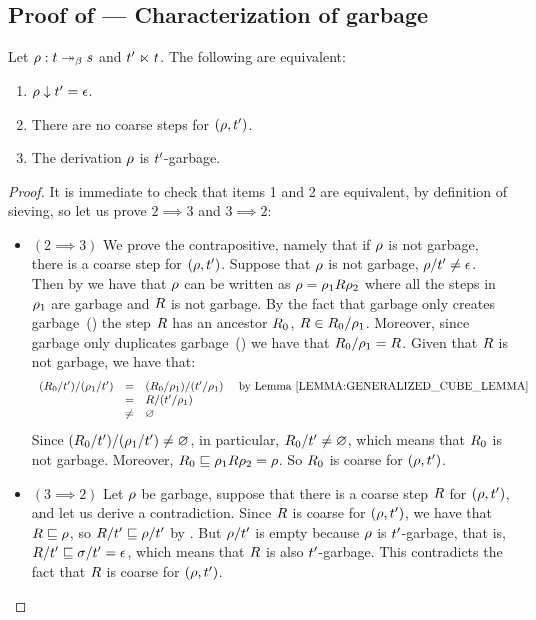 \subsection*{Proof of  --- Characterization of garbage}
\label{characterization_of_garbage_proof}
Let $\rho : t \mathrel{\twoheadrightarrow_\beta} s$ and $t' \mathrel{\ltimes} t$.
The following are equivalent:
\begin{enumerate}
\item $\rho \downarrow t' = \epsilon$.
\item There are no coarse steps for $(\rho,t')$.
\item The derivation $\rho$ is $t'$-garbage.
\end{enumerate}
\begin{proof}
It is immediate to check that items 1 and 2 are equivalent, by definition of sieving,
so let us prove $2 \implies 3$ and $3 \implies 2$:
\begin{itemize}
\item $(2 \implies 3)$
  We prove the contrapositive, namely that if $\rho$ is not garbage,
  there is a coarse step for $(\rho,t')$.
  Suppose that $\rho$ is not garbage, \ie $\rho/t' \neq \epsilon$.
  Then by 
  we have that $\rho$ can be written as $\rho = \rho_1 R \rho_2$ where
  all the steps in $\rho_1$ are garbage and $R$ is not garbage.
  By the fact that garbage only creates garbage~()
  the step $R$ has an ancestor $R_0$, \ie $R \in R_0/\rho_1$.
  Moreover, since garbage only duplicates garbage~()
  we have that $R_0/\rho_1 = R$.
  Given that $R$ is not garbage, we have that:
  \[
    \begin{array}{rcll}
          (\redex_0/\tm')/(\redseq_1/\tm')
    & = & (\redex_0/\redseq_1)/(\tm'/\redseq_1) & \text{ by \rlem{generalized_cube_lemma}} \\
    & = & \redex/(\tm'/\redseq_1) \\
    & \neq & \emptyset \\
    \end{array}
  \]
  Since $(R_0/t')/(\rho_1/t') \neq \varnothing$, in particular,
  $R_0/t' \neq \varnothing$, which means that $R_0$ is not garbage.
  Moreover, $R_0 \sqsubseteq \rho_1R\rho_2 = \rho$.
  So $R_0$ is coarse for $(\rho,t')$.
\item $(3 \implies 2)$
  Let $\rho$ be garbage, suppose that there is a coarse step $R$ for $(\rho,t')$,
  and let us derive a contradiction.
  Since $R$ is coarse for $(\rho,t')$,
  we have that $R \sqsubseteq \rho$,
  so $R/t' \sqsubseteq \rho/t'$ by .
  But $\rho/t'$ is empty because $\rho$ is $t'$-garbage,
  that is, $R/t' \sqsubseteq \sigma/t' = \epsilon$,
  which means that $R$ is also $t'$-garbage.
  This contradicts the fact that $R$ is coarse for $(\rho,t')$.
\end{itemize}
\end{proof}


